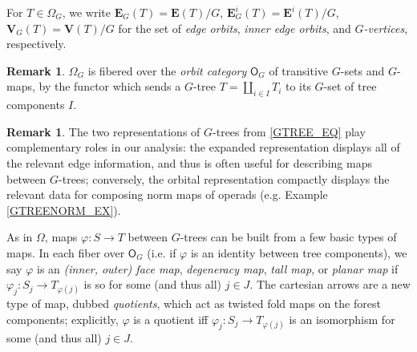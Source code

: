 \documentclass[a4paper,10pt
,draft
]{article}%
\numberwithin{equation}{section}
\numberwithin{figure}{section}
\theoremstyle{definition} %
\newtheorem{remark}[equation]{Remark}%
\newcommand{\1}{\ensuremath{\mathbbm 1}}%
\begin{document}
For $T \in \Omega_G$, we write
$\boldsymbol{E}_G(T) = \boldsymbol{E}(T)/G$, $\boldsymbol{E}^i_G(T) = \boldsymbol{E}^i(T)/G$, $\boldsymbol{V}_G(T) = \boldsymbol{V}(T)/G$
for the set of \textit{edge orbits}, \textit{inner edge orbits}, and \textit{$G$-vertices}, respectively.

\begin{remark}
      $\Omega_G$ is fibered over the \textit{orbit category} $\mathsf O_G$ of transitive $G$-sets and $G$-maps,
      by the functor which sends a $G$-tree $T = \amalg_{i \in I} T_i$ to its $G$-set of tree components $I$.
\end{remark}


\begin{remark}
      The two representations of $G$-trees from \eqref{GTREE_EQ} play complementary roles in our analysis:
      the expanded representation displays all of the relevant edge information, and thus is often useful for describing maps between $G$-trees;
      conversely, the orbital representation compactly displays the relevant data for composing norm maps of operads (e.g. {\color{blue} Example \ref{GTREENORM_EX}}).
\end{remark}

As in $\Omega$,
maps $\varphi \colon S \to T$ between $G$-trees
can be built from a few basic types of maps.
In each fiber over $\mathsf O_G$ 
(i.e. if $\varphi$ is an identity between tree components), we say $\varphi$ is an
\textit{(inner, outer) face map}, \textit{degeneracy map}, \textit{tall map}, or \textit{planar map} if
$\varphi_j \colon S_j \to T_{\varphi(j)}$ is so for some (and thus all) $j \in J$.
The cartesian arrows are a new type of map, dubbed \textit{quotients},
which act as twisted fold maps on the forest components;
explicitly, $\varphi$ is a quotient iff $\varphi_j \colon S_j \to T_{\varphi(j)}$ is an isomorphism for some (and thus all) $j \in J$.
\end{document}
